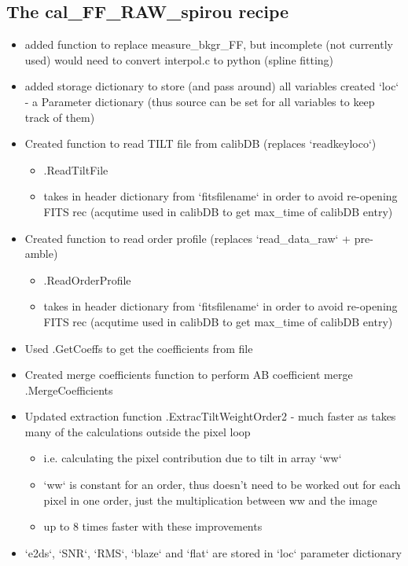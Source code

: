 \subsection{The cal\_FF\_RAW\_spirou recipe}
\label{ch:changelog:At4:cal_FF_RAW_spirou}

\begin{itemize}
\item added function to replace measure\_bkgr\_FF, but incomplete (not currently used) would need to convert interpol.c to python (spline fitting)

\item added storage dictionary to store (and pass around) all variables created `loc` - a Parameter dictionary (thus source can be set for all variables to keep track of them)

\item Created function to read TILT file from calibDB (replaces `readkeyloco`)
	\begin{itemize}
    \item \spirouImage.ReadTiltFile
    \item takes in header dictionary from `fitsfilename` in order to avoid re-opening FITS rec (acqutime used in calibDB to get max\_time of calibDB entry) 
    \end{itemize}
\item Created function to read order profile (replaces `read\_data\_raw` + pre-amble)
	\begin{itemize}
	\item \spirouImage.ReadOrderProfile
	\item takes in header dictionary from `fitsfilename` in order to avoid re-opening FITS rec (acqutime used in calibDB to get max\_time of calibDB entry) 
    \end{itemize}
\item Used \spirouLOCOR.GetCoeffs to get the coefficients from file

\item Created merge coefficients function to perform AB coefficient merge \spirouLOCOR.MergeCoefficients
    
\item Updated extraction function \spirouEXTOR.ExtracTiltWeightOrder2 - much faster as takes many of the calculations outside the pixel loop
	\begin{itemize}
	\item i.e. calculating the pixel contribution due to tilt in array `ww`
	\item `ww` is constant for an order, thus doesn't need to be worked out for each pixel in one order, just the multiplication between ww and the image
	\item up to 8 times faster with these improvements
    \end{itemize}
\item `e2ds`, `SNR`, `RMS`, `blaze` and `flat` are stored in `loc` parameter dictionary


\end{itemize}
